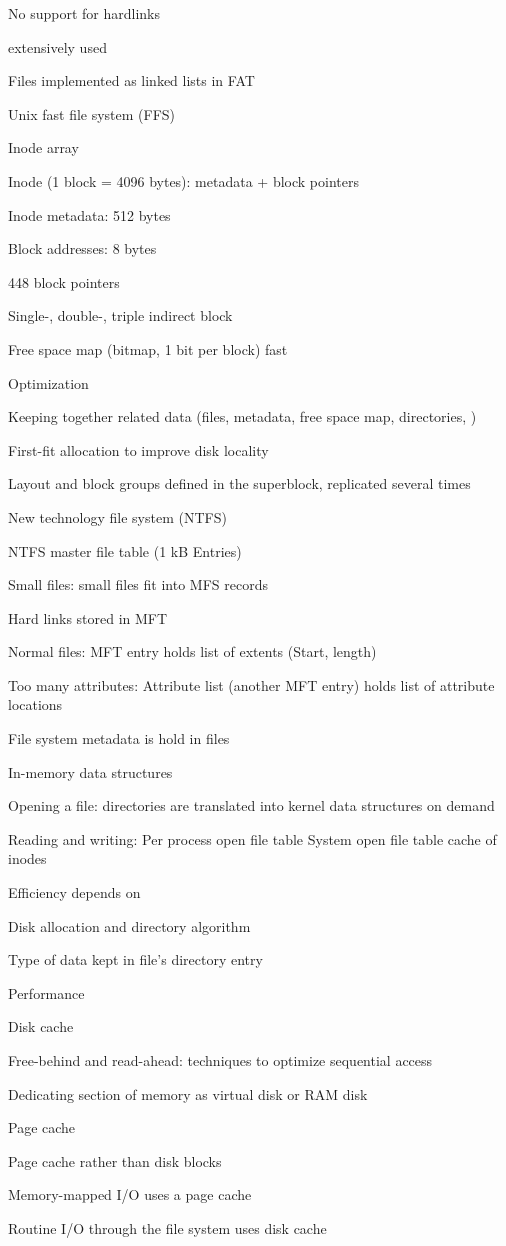 		\item No support for hardlinks
		\item extensively used
		\item Files implemented as linked lists in FAT
	\enumend
	\item Unix fast file system (FFS)
	\enumstart
		\item Inode array
		\item Inode (1 block = 4096 bytes): metadata + block pointers
		\item Inode metadata: 512 bytes
		\item Block addresses: 8 bytes
		\item 448 block pointers
		\item Single-, double-, triple indirect block
		\item Free space map (bitmap, 1 bit per block) \arrow fast
	\enumend
	\item Optimization
	\enumstart
		\item Keeping together related data (files, metadata, free space map, directories, \ddd)
		\item First-fit allocation to improve disk locality
		\item Layout and block groups defined in the superblock, replicated several times
	\enumend
	\item New technology file system (NTFS)
	\enumstart
		\item NTFS master file table (1 kB Entries)
		\item Small files: small files fit into MFS records
		\item Hard links stored in MFT
		\item Normal files: MFT entry holds list of extents (Start, length)
		\item Too many attributes: Attribute list (another MFT entry) holds list of attribute locations
		\item File system metadata is hold in files
	\enumend
	\item In-memory data structures
	\enumstart
		\item Opening a file: directories are translated into kernel data structures on demand
		\item Reading and writing: Per process open file table \arrow System open file table \arrow cache of inodes
	\enumend
	\item Efficiency depends on
	\enumstart
		\item Disk allocation and directory algorithm
		\item Type of data kept in file's directory entry
	\enumend
	\item Performance
	\enumstart
		\item Disk cache
		\item Free-behind and read-ahead: techniques to optimize sequential access
		\item Dedicating section of memory as virtual disk or RAM disk
	\enumend
	\item Page cache
	\enumstart
		\item Page cache rather than disk blocks
		\item Memory-mapped I/O uses a page cache
		\item Routine I/O through the file system uses disk cache
	\enumend
\enumend
